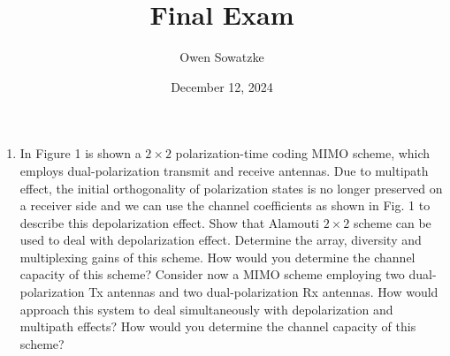\documentclass[fleqn]{article}
\title{Final Exam}
\author{Owen Sowatzke}
\date{December 12, 2024}
\newcommand{\zerodisplayskip}{
	\setlength{\abovedisplayskip}{0pt}%
	\setlength{\belowdisplayskip}{0pt}%
	\setlength{\abovedisplayshortskip}{0pt}%
	\setlength{\belowdisplayshortskip}{0pt}%
	\setlength{\mathindent}{0pt}}
\begin{document}
	\offinterlineskip
	\setlength{\lineskip}{12pt}
	\setcounter{MaxMatrixCols}{20}
	\zerodisplayskip
	\maketitle
	
	\begin{enumerate}
		\item In Figure 1 is shown a $2 \times 2$ polarization-time coding MIMO scheme, which employs dual-polarization transmit and receive antennas. Due to multipath effect, the initial orthogonality of polarization states is no longer preserved on a receiver side and we can use the channel coefficients as shown in Fig. 1 to describe this depolarization effect. Show that Alamouti $2 \times 2$ scheme can be used to deal with depolarization effect. Determine the array, diversity and multiplexing gains of this scheme. How would you determine the channel capacity of this scheme? Consider now a MIMO scheme employing two dual-polarization Tx antennas and two dual-polarization Rx antennas. How would approach this system to deal simultaneously with depolarization and multipath effects? How would you determine the channel capacity of this scheme?

		\begin{figure}[H]
			\centerline{}
			\caption{}
			\label{fig::2x2_polarization_time_coding_mimo}
		\end{figure}
		

\end{enumerate}
\end{document}
